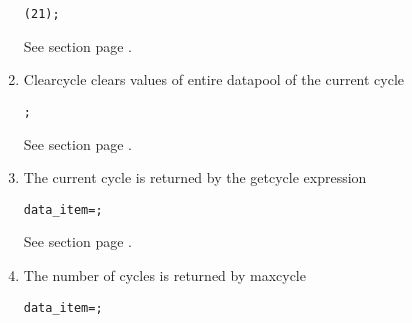 \begin{enumerate}
\begin{boxedminipage}[t]{\linewidth}
\begin{alltt}
  \GOCYCLE( 21 );
\end{alltt}
\end{boxedminipage}

See section  page \pageref{fucyclestatements}. \\
\item Clearcycle clears values of entire datapool of the current cycle

\begin{boxedminipage}[t]{\linewidth}
\begin{alltt}
  \CLEARCYCLE;
\end{alltt}
\end{boxedminipage}

See section  page \pageref{fucyclestatements}. \\

\item The current cycle is returned by the getcycle expression

\begin{boxedminipage}[t]{\linewidth}
\begin{alltt}
  data_item = \GETCYCLE;
\end{alltt}
\end{boxedminipage}

See section  page \pageref{fuexpressionsdata}. \\
\item The number of cycles is returned by maxcycle

\begin{boxedminipage}[t]{\linewidth}
\begin{alltt}
  data_item = \MAXCYCLE;
\end{alltt}
\end{boxedminipage}


\end{enumerate}
